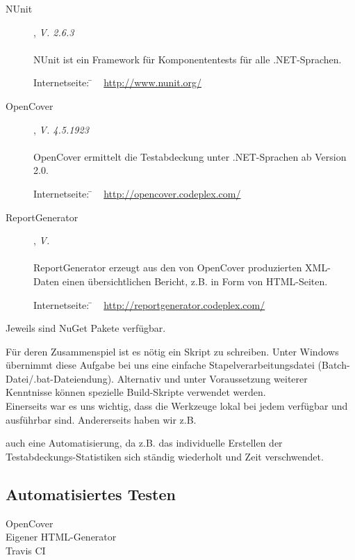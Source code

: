 \begin{description}

	\item[NUnit], \textit{V. 2.6.3}\hfill
	\\
	\\
	NUnit ist ein Framework für Komponententests für alle .NET-Sprachen.
	
	\begin{tabbing}
		Internetseite:
		\= ~ \href {http://www.nunit.org/}
	    	       {http://www.nunit.org/}
	    \\
	\end{tabbing}
	
	
	\item[OpenCover], \textit{V. 4.5.1923}\hfill
	\\
	\\
	OpenCover ermittelt die Testabdeckung unter .NET-Sprachen ab Version 2.0.
	
	\begin{tabbing}
		Internetseite:
		\= ~ \href {http://opencover.codeplex.com/}
	    	       {http://opencover.codeplex.com/}
	    \\
	\end{tabbing}
	
	
	\item[ReportGenerator], \textit{V. }\hfill
	\\
	\\
	ReportGenerator erzeugt aus den von OpenCover produzierten XML-Daten einen übersichtlichen Bericht, z.B. in Form von HTML-Seiten.
	\begin{tabbing}
			Internetseite:
			\= ~ \href {http://reportgenerator.codeplex.com/}
		    	       {http://reportgenerator.codeplex.com/}
		    \\
	\end{tabbing}

\end{description}

Jeweils sind NuGet Pakete verfügbar.

Für deren Zusammenspiel ist es nötig ein Skript zu schreiben. Unter Windows übernimmt diese Aufgabe bei uns eine einfache Stapelverarbeitungsdatei (Batch-Datei/.bat-Dateiendung).
Alternativ und unter Voraussetzung weiterer Kenntnisse können spezielle Build-Skripte verwendet werden.\\
Einerseits war es uns wichtig, dass die Werkzeuge lokal bei jedem verfügbar und ausführbar sind. Andererseits haben wir z.B.


auch eine Automatisierung, da z.B. das individuelle Erstellen der Testabdeckungs-Statistiken sich ständig wiederholt und Zeit verschwendet. %



\subsection{Automatisiertes Testen}
\label{Abschnitt:Programmfehler:Werkzeuge:Automatisiert}


\begin{description}

	\item[OpenCover]
	
	\item[Eigener HTML-Generator]
	
	\item[Travis CI]

\end{description}


